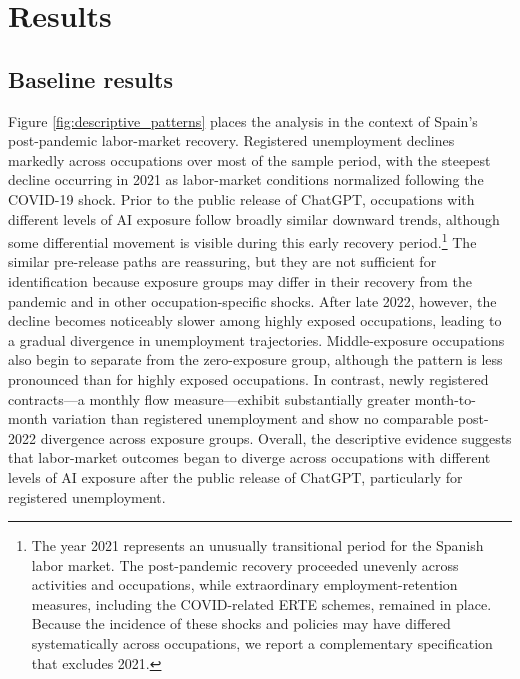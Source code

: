 \section{Results}
\label{sec:results}

\subsection{Baseline results}

Figure \ref{fig:descriptive_patterns} places the analysis in the context of Spain's post-pandemic labor-market recovery. Registered unemployment declines markedly across occupations over most of the sample period, with the steepest decline occurring in 2021 as labor-market conditions normalized following the COVID-19 shock. Prior to the public release of ChatGPT, occupations with different levels of AI exposure follow broadly similar downward trends, although some differential movement is visible during this early recovery period.\footnote{The year 2021 represents an unusually transitional period for the Spanish labor market. The post-pandemic recovery proceeded unevenly across activities and occupations, while extraordinary employment-retention measures, including the COVID-related ERTE schemes, remained in place. Because the incidence of these shocks and policies may have differed systematically across occupations, we report a complementary specification that excludes 2021.} The similar pre-release paths are reassuring, but they are not sufficient for identification because exposure groups may differ in their recovery from the pandemic and in other occupation-specific shocks. After late 2022, however, the decline becomes noticeably slower among highly exposed occupations, leading to a gradual divergence in unemployment trajectories. Middle-exposure occupations also begin to separate from the zero-exposure group, although the pattern is less pronounced than for highly exposed occupations. In contrast, newly registered contracts---a monthly flow measure---exhibit substantially greater month-to-month variation than registered unemployment and show no comparable post-2022 divergence across exposure groups. Overall, the descriptive evidence suggests that labor-market outcomes began to diverge across occupations with different levels of AI exposure after the public release of ChatGPT, particularly for registered unemployment.

